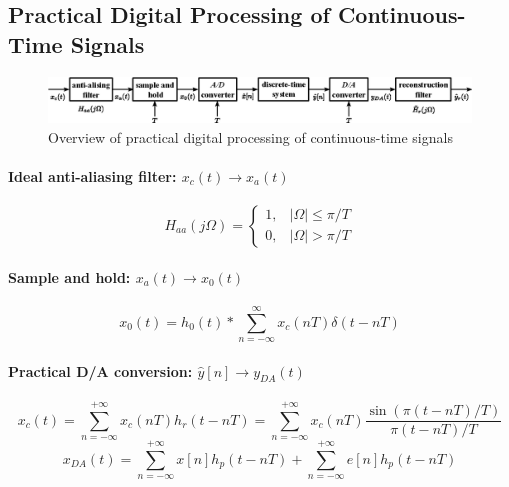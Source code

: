 \newpage

\subsection{Practical Digital Processing of Continuous-Time Signals}
\begin{figure}[H]
    \centering
    \includegraphics[width=\textwidth]{images/digital-processing-of-continuous-signals.eps}
    \caption{Overview of practical digital processing of continuous-time signals}
    \label{fig:dsp}
\end{figure}

\paragraph{Ideal anti-aliasing filter: $x_{c}(t) \to x_{a}(t)$}
\[
    H_{aa}(j\Omega) = 
    \begin{cases}
    1,  & \lvert \Omega \rvert \leq \pi/T \\
    0,  & \lvert \Omega \rvert > \pi/T
    \end{cases}
\]

\paragraph{Sample and hold: $x_{a}(t) \to x_{0}(t)$}
\[
    x_0(t) = h_0(t) * \sum_{n=-\infty}^{\infty} x_{c}(nT)\delta(t-nT)
\]

\paragraph{Practical D/A conversion: $\hat{y}[n] \to y_{DA}(t)$}
\[
    x_{c}(t) = \sum_{n=-\infty}^{+\infty} x_{c}(nT)h_{r}(t-nT) = \sum_{n=-\infty}^{+\infty} x_{c}(nT) \frac{\sin(\pi(t-nT)/T)}{\pi(t-nT)/T}
\]
\[
    x_{DA}(t) = \sum_{n=-\infty}^{+\infty} x[n]h_{p}(t-nT) + \sum_{n=-\infty}^{+\infty} e[n]h_{p}(t-nT)
\]

